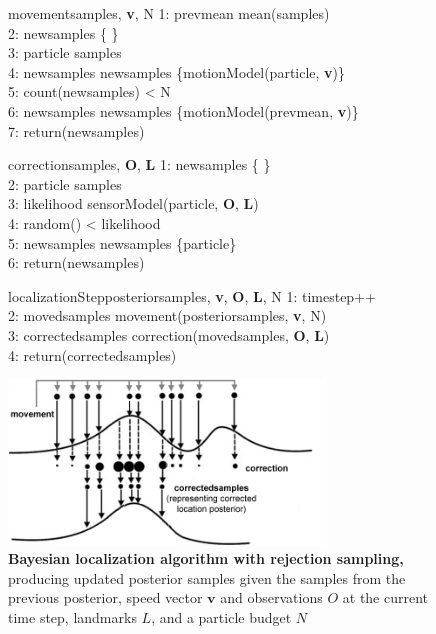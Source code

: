 \begin{figure}[h]
	\begin{pseudocode}{movement}{samples, \textbf{v}, N}
		1: prevmean \GETS mean(samples) \\
		2: newsamples \GETS \{ \} \\
		3: \FOREACH particle \in samples \\
		4: \quad newsamples \GETS newsamples \cup \{motionModel(particle, \textbf{v})\} \\
		5: \WHILE count(newsamples) < N \\
		6: \quad newsamples \GETS newsamples \cup \{motionModel(prevmean, \textbf{v})\} \\
		7: return(newsamples)
	\end{pseudocode}
	\begin{pseudocode}{correction}{samples, \textbf{O}, \textbf{L}}
		1: newsamples \GETS \{ \} \\
		2: \FOREACH particle \in samples \\
		3: \quad likelihood \GETS sensorModel(particle, \textbf{O}, \textbf{L}) \\
		4: \quad \IF random() < likelihood \\
		5: \quad \quad newsamples \GETS newsamples \cup \{particle\} \\
		6: return(newsamples)
	\end{pseudocode}
	\begin{pseudocode}{localizationStep}{posteriorsamples, \textbf{v}, \textbf{O}, \textbf{L}, N}
		1: timestep++ \\
		2: movedsamples \GETS movement(posteriorsamples, \textbf{v}, N) \\
		3: correctedsamples \GETS  correction(movedsamples, \textbf{O}, \textbf{L}) \\
		4: return(correctedsamples)
	\end{pseudocode}
	\centering
	\includegraphics[width=0.75\textwidth]{img/rejectionsampling}
	\caption[Bayesian localization algorithm with rejection sampling]{\textbf{Bayesian localization algorithm with rejection sampling,} producing updated posterior samples given the samples from the previous posterior, speed vector $\bm v$ and observations $O$ at the current time step, landmarks $L$, and a particle budget $N$}
	\label{fig:bayesloc}
\end{figure}

